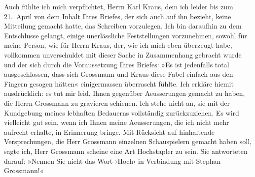 \begin{ledgroupsized}[t]{13cm}
               Auch fühlte ich mich verpflichtet, Herrn Karl
                  Kraus, dem ich leider bis zum 21. April von dem Inhalt Ihres
               Briefes, der sich auch auf ihn bezieht, keine Mitteilung gemacht hatte, das Schreiben
               vorzulegen. Ich bin daraufhin zu dem Entschlusse gelangt, einige unerlässliche
               Feststellungen vorzunehmen, sowohl für meine Person, wie für Herrn Kraus, der, wie ich mich eben überzeugt habe,
               vollkommen unverschuldet mit dieser Sache in Zusammenhang gebracht wurde und der sich
               durch die Voraussetzung Ihres Briefes: »Es ist jedenfalls total ausgeschlossen, dass
               sich Grossmann und Kraus diese Fabel einfach aus den Fingern gesogen hätten«
               einigermassen überrascht fühlte.\pend
           \pstart
           Ich erkläre hiemit ausdrücklich: es tut mir leid, Ihnen gegenüber Aeusserungen
               gemacht zu haben, die Herrn Grossmann zu
               gravieren schienen. Ich stehe nicht an, sie mit der Kundgebung meines lebhaften
               Bedauerns vollständig zurückzuziehen. Es wird vielleicht gut sein, wenn ich Ihnen
               meine Aeusserungen, die ich nicht mehr aufrecht erhalte, in Erinnerung bringe. Mit
               Rücksicht auf hinhaltende Versprechungen, die Herr Grossmann einzelnen {\pb}Schauspielern gemacht
               haben soll, sagte ich, Herr Grossmann scheine
               eine Art Hochstapler zu sein. Sie antworteten darauf: »Nennen Sie nicht das Wort
               ›Hoch‹ in Verbindung mit Stephan Grossmann!«

\end{ledgroupsized}
